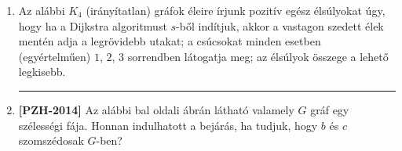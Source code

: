 \documentclass[a4paper,12pt]{article}
\begin{document}
\begin{enumerate}
        \item Az alábbi $K_4$ (irányítatlan) gráfok éleire írjunk pozitív egész élsúlyokat úgy, hogy ha a Dijkstra algoritmust $s$-ből indítjuk, akkor a vastagon szedett élek mentén adja a legrövidebb utakat; a csúcsokat minden esetben (egyértelműen) $1$, $2$, $3$ sorrendben látogatja meg; az élsúlyok összege a lehető legkisebb.
        \begin{figure}[!h]
            \centering
            \begin{subfigure}{0.15\textwidth}
                \centering
                
            \end{subfigure}
            \begin{subfigure}{0.15\textwidth}
                \centering
                
            \end{subfigure}
            \begin{subfigure}{0.15\textwidth}
                \centering
                
            \end{subfigure}
            \begin{subfigure}{0.15\textwidth}
                \centering
                
            \end{subfigure}
            \begin{subfigure}{0.15\textwidth}
                \centering
                
            \end{subfigure}
            \begin{subfigure}{0.15\textwidth}
                \centering
                
            \end{subfigure}
        \end{figure}

        \hrule

        \item \textbf{[PZH-2014]} Az alábbi bal oldali ábrán látható valamely $G$ gráf egy szélességi fája. Honnan indulhatott a bejárás, ha tudjuk, hogy $b$ és $c$ szomszédosak $G$-ben?
        
        \begin{minipage}{6in}
            \centering
            \raisebox{-0.5\height}{} \hspace{1in}
            \raisebox{-0.5\height}{}
        \end{minipage}
        

\end{enumerate}
\end{document}
